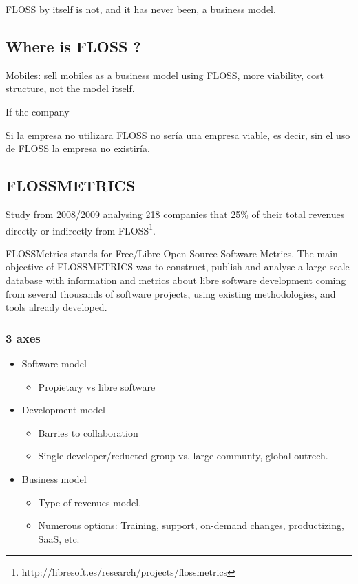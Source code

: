 FLOSS by itself is not, and it has never been, a business model.

\subsection{Where is FLOSS ?}\label{sec:floss-bm}

Mobiles: sell mobiles as a business model using FLOSS, more viability, cost
 structure, not the model itself.

If the company

Si la empresa no utilizara FLOSS no sería una empresa viable, es decir, sin el
 uso de FLOSS la empresa no existiría.

\subsection{FLOSSMETRICS}

Study from 2008/2009 analysing 218 companies that 25\% of their total revenues
 directly or indirectly from FLOSS\footnote{http://libresoft.es/research/projects/flossmetrics}.

FLOSSMetrics stands for Free/Libre Open Source Software Metrics. 
The main objective of FLOSSMETRICS was to construct, publish and analyse a large
 scale database with information and metrics about libre software development 
 coming from several thousands of software projects, using existing 
 methodologies, and tools already developed.

\subsubsection{3 axes}

\begin{itemize}
    \item Software model
    \begin{itemize}
        \item Propietary vs libre software
    \end{itemize}
    
    \item Development model
    \begin{itemize}
        \item Barries to collaboration
        \item Single developer/reducted group vs. large communty, global outrech.
    \end{itemize}
    
    \item Business model
    \begin{itemize}
        \item Type of revenues model.
        \item Numerous options: Training, support, on-demand changes, productizing, SaaS, etc.
    \end{itemize}
\end{itemize}

